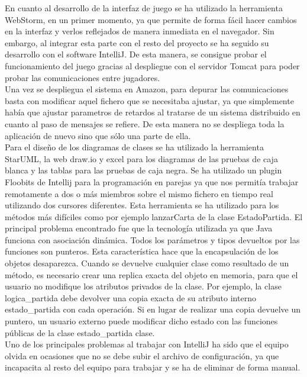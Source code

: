 En cuanto al desarrollo de la interfaz de juego se ha utilizado la herramienta WebStorm, en un primer momento, ya que permite de forma fácil hacer cambios en la interfaz y verlos reflejados de manera inmediata en el navegador. Sin embargo, al integrar esta parte con el resto del proyecto se ha seguido su desarrollo con el software IntelliJ. De esta manera, se consigue probar el funcionamiento del juego gracias al despliegue con el servidor Tomcat para poder probar las comunicaciones entre jugadores.
\\
Una vez se despliegua el sistema en Amazon, para depurar las comunicaciones basta con modificar aquel fichero que se necesitaba ajustar, ya que simplemente había que ajustar parametros de retardos al tratarse de un sistema distribuido en cuanto al paso de mensajes se refiere. De esta manera no se despliega toda la aplicación de nuevo sino que sólo una parte de ella.
\\
Para el diseño de los diagramas de clases se ha utilizado la herramienta StarUML, la web draw.io y excel para los diagramas de las pruebas de caja blanca y las tablas para las pruebas de caja negra.
Se ha utilizado un plugin Floobits de Intellij para la programación en parejas ya que nos permitía trabajar remotamente a dos o más miembros sobre el mismo fichero en tiempo real utilizando dos cursores diferentes. Esta herramienta se ha utilizado para los métodos más difíciles como por ejemplo lanzarCarta de la clase EstadoPartida.
El principal problema encontrado fue que la tecnología utilizada ya que Java funciona con asociación dinámica. Todos los parámetros y tipos devueltos por las funciones son punteros. Esta característica hace que la encapsulación de los objetos desaparezca. Cuando se devuelve cualquier clase como resultado de un método, es necesario crear una replica exacta del objeto en memoria, para que el usuario no modifique los atributos privados de la clase. Por ejemplo, la clase logica\_partida debe devolver una copia exacta de su atributo interno estado\_partida con cada operación. Si en lugar de realizar una copia devuelve un puntero, un usuario externo puede modificar dicho estado con las funciones públicas de la clase estado\_partida clase.
\\
Uno de los principales problemas al trabajar con IntelliJ ha sido que el equipo olvida en ocasiones que no se debe subir el archivo de configuración, ya que incapacita al resto del equipo para trabajar y se ha de eliminar de forma manual.

